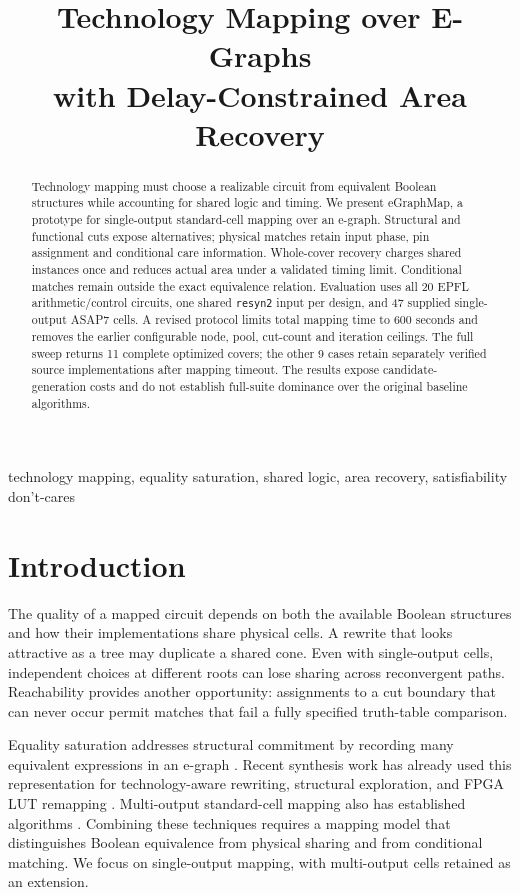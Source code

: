 \documentclass[conference]{IEEEtran}
\title{Technology Mapping over E-Graphs\protect\\with Delay-Constrained Area Recovery}
\author{\IEEEauthorblockN{Anonymous Authors}}
\newcommand{\tool}{eGraphMap}
\begin{document}
\maketitle
\begin{abstract}
Technology mapping must choose a realizable circuit from equivalent Boolean structures while accounting for shared logic and timing.
We present \tool, a prototype for single-output standard-cell mapping over an e-graph.
Structural and functional cuts expose alternatives; physical matches retain input phase, pin assignment and conditional care information.
Whole-cover recovery charges shared instances once and reduces actual area under a validated timing limit.
Conditional matches remain outside the exact equivalence relation.
Evaluation uses all 20 EPFL arithmetic/control circuits, one shared \texttt{resyn2} input per design, and 47 supplied single-output ASAP7 cells.
A revised protocol limits total mapping time to 600 seconds and removes the earlier configurable node, pool, cut-count and iteration ceilings.
The full sweep returns 11 complete optimized covers; the other 9 cases retain separately verified source implementations after mapping timeout.
The results expose candidate-generation costs and do not establish full-suite dominance over the original baseline algorithms.
\end{abstract}
\begin{IEEEkeywords}
technology mapping, equality saturation, shared logic, area recovery,
satisfiability don't-cares
\end{IEEEkeywords}

\section{Introduction}
The quality of a mapped circuit depends on both the available Boolean
structures and how their implementations share physical cells. A rewrite
that looks attractive as a tree may duplicate a shared cone. Even with
single-output cells, independent choices at different roots can lose
sharing across reconvergent paths. Reachability provides another
opportunity: assignments to a cut boundary that can never occur permit
matches that fail a fully specified truth-table comparison.

Equality saturation addresses structural commitment by recording many
equivalent expressions in an e-graph \cite{egg}. Recent synthesis work has
already used this representation for technology-aware rewriting,
structural exploration, and FPGA LUT remapping
\cite{esyn,emorphic,eqmap}. Multi-output standard-cell mapping also has
established algorithms \cite{emap}. Combining these techniques requires a mapping model that distinguishes
Boolean equivalence from physical sharing and from conditional matching.
We focus on single-output mapping, with multi-output cells retained as an extension.
\end{document}
